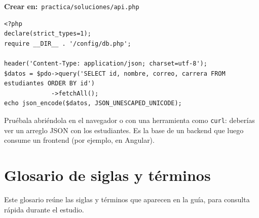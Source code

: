 \documentclass[11pt]{article}
\begin{document}
{\small\color{phpazulo}\textbf{Crear en:}~}\texttt{practica/\allowbreak{}soluciones/\allowbreak{}api.\allowbreak{}php}\par\nobreak\vspace{-1pt}
\begin{cajacodigo}
\begin{lstlisting}[style=php]
<?php
declare(strict_types=1);
require __DIR__ . '/config/db.php';

header('Content-Type: application/json; charset=utf-8');
$datos = $pdo->query('SELECT id, nombre, correo, carrera FROM estudiantes ORDER BY id')
             ->fetchAll();
echo json_encode($datos, JSON_UNESCAPED_UNICODE);
\end{lstlisting}
\end{cajacodigo}
\vspace{2pt}
Pruébala abriéndola en el navegador o con una herramienta como \texttt{curl}: deberías ver un arreglo JSON con los estudiantes. Es la base de un backend que luego consume un frontend (por ejemplo, en Angular).

\section{Glosario de siglas y términos}
Este glosario reúne las siglas y términos que aparecen en la guía, para consulta rápida durante el estudio.
\end{document}

